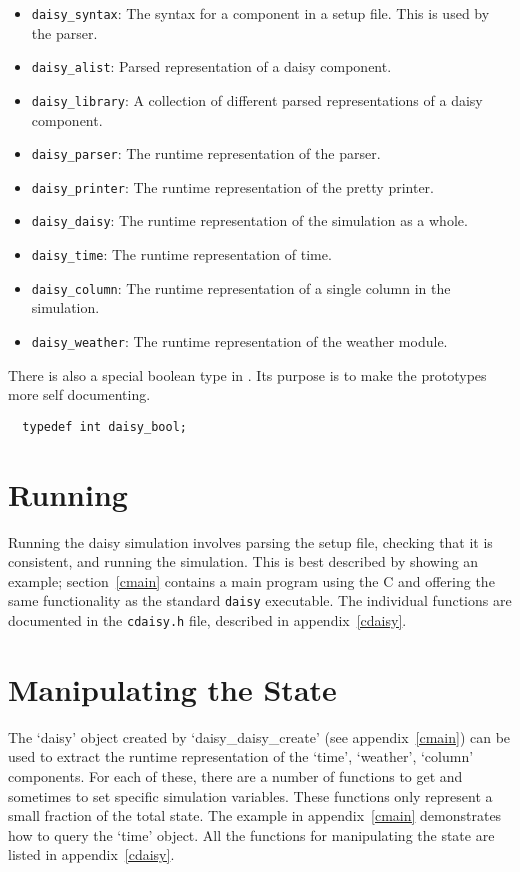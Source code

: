 \documentclass[a4paper,10pt,titlepage]{article}
\begin{document}
\begin{itemize}
\item \texttt{daisy\_syntax}: The syntax for a component in a \daisy{}
  setup file.  This is used by the parser.
\item \texttt{daisy\_alist}: Parsed representation of a daisy component.
\item \texttt{daisy\_library}: A collection of different parsed
  representations of a daisy component.
\item \texttt{daisy\_parser}: The runtime representation of the
  parser. 
\item \texttt{daisy\_printer}: The runtime representation of the
  pretty printer.
\item \texttt{daisy\_daisy}: The runtime representation of the
  \daisy{} simulation as a whole.
\item \texttt{daisy\_time}: The runtime representation of time.
\item \texttt{daisy\_column}: The runtime representation of a single
  column in the \daisy{} simulation.
\item \texttt{daisy\_weather}: The runtime representation of the
  \daisy{} weather module.
\end{itemize}

There is also a special boolean type in \daisy{}.  Its purpose is to
make the prototypes more self documenting.

\begin{verbatim}
  typedef int daisy_bool;
\end{verbatim}

\section{Running \Daisy{}}

Running the daisy simulation involves parsing the setup file, checking
that it is consistent, and running the simulation.  This is best
described by showing an example; section~\ref{cmain} contains a main
program using the C \api{} and offering the same functionality as the
standard \texttt{daisy} executable.  The individual functions are
documented in the \texttt{cdaisy.h} file, described in
appendix~\ref{cdaisy}. 

\section{Manipulating the State}

The `daisy' object created by `daisy\_daisy\_create' (see
appendix~\ref{cmain}) can be used to extract the runtime
representation of the `time', `weather', `column' components.  For
each of these, there are a number of functions to get and sometimes to
set specific simulation variables.  These functions only represent a
small fraction of the total state.  The example in
appendix~\ref{cmain} demonstrates how to query the `time' object.
All the functions for manipulating the state are listed in
appendix~\ref{cdaisy}. 
\end{document}
